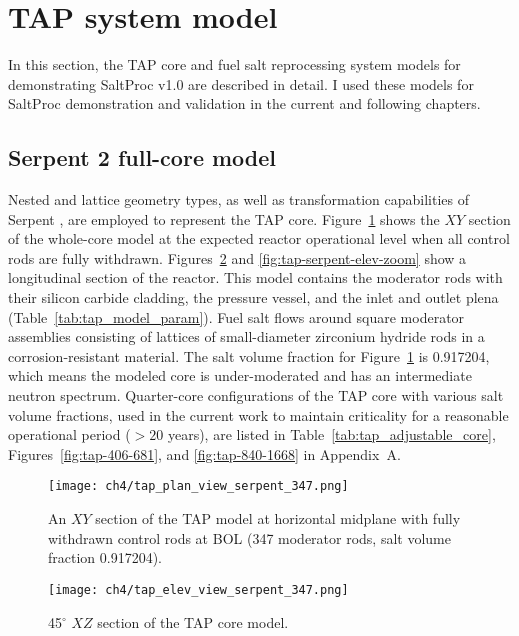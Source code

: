 \section{TAP system model} \label{sec:tap_model}
In this section, the \gls{TAP} core and fuel salt reprocessing system models  
for demonstrating SaltProc v1.0 are described in detail. I used these models 
for SaltProc demonstration and validation in the current and following 
chapters.

\subsection{Serpent 2 full-core model} 
Nested and lattice geometry types, as well as transformation capabilities of 
Serpent \cite{leppanen_serpent_2014}, are employed to represent the \gls{TAP} 
core. Figure~\ref{fig:tap-serpent-plan} shows the $XY$ section of the 
whole-core model at the expected reactor operational level when all control 
rods are fully withdrawn. Figures~\ref{fig:tap-serpent-elev} and 
\ref{fig:tap-serpent-elev-zoom} show a longitudinal section of the 
reactor. This model contains the moderator rods with their silicon carbide 
cladding, the pressure vessel, and the inlet and outlet plena 
(Table~\ref{tab:tap_model_param}). 
Fuel salt flows around square moderator assemblies consisting of lattices 
of small-diameter zirconium hydride rods in a corrosion-resistant material. 
The salt volume fraction for Figure~\ref{fig:tap-serpent-plan} is 0.917204, 
which means the modeled core is under-moderated and has an intermediate 
neutron spectrum. Quarter-core configurations of the \gls{TAP} core with 
various salt volume fractions, used in the current work to maintain 
criticality for a reasonable operational period ($>20$ years), are listed in 
Table~\ref{tab:tap_adjustable_core}, Figures~\ref{fig:tap-406-681}, and 
\ref{fig:tap-840-1668} in Appendix~A.
\begin{figure}[htp!] %
	\centering
	\texttt{[image: ch4/tap\_plan\_view\_serpent\_347.png]}
	\caption{An $XY$ section of the \gls{TAP} model at horizontal midplane 
		with fully withdrawn control rods at \gls{BOL} (347 moderator rods, 
		salt volume fraction 0.917204).}
	\label{fig:tap-serpent-plan}
\end{figure}

\begin{figure}[htp!] %
	\centering
	\texttt{[image: ch4/tap\_elev\_view\_serpent\_347.png]}
	\caption{45$^{\circ}$ $XZ$ section of the \gls{TAP} core model.}
	\label{fig:tap-serpent-elev}
\end{figure}

